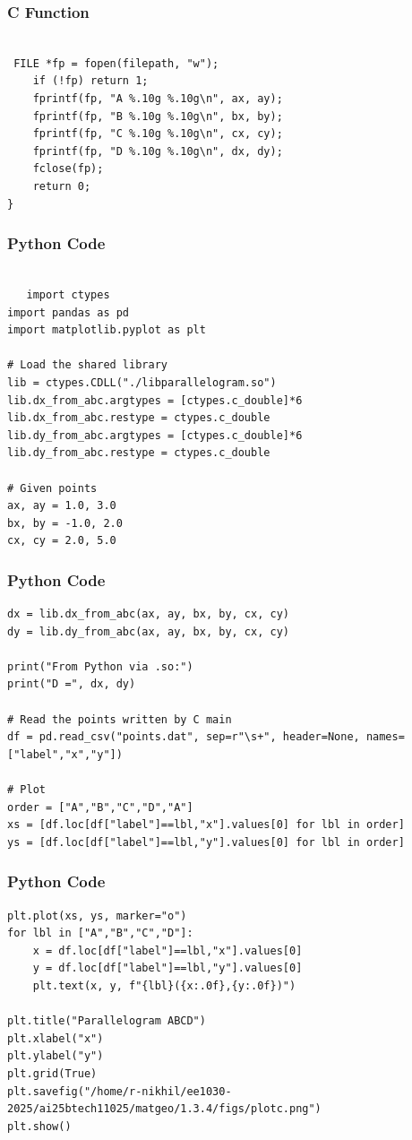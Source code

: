 \documentclass{beamer}
\begin{document}
\begin{frame}[fragile]
\frametitle{C Function}
   \begin{lstlisting}

 FILE *fp = fopen(filepath, "w");
    if (!fp) return 1;
    fprintf(fp, "A %.10g %.10g\n", ax, ay);
    fprintf(fp, "B %.10g %.10g\n", bx, by);
    fprintf(fp, "C %.10g %.10g\n", cx, cy);
    fprintf(fp, "D %.10g %.10g\n", dx, dy);
    fclose(fp);
    return 0;
}

   \end{lstlisting}
\end{frame}

\begin{frame}[fragile]
\frametitle{Python Code}
   \begin{lstlisting}

   import ctypes
import pandas as pd
import matplotlib.pyplot as plt

# Load the shared library
lib = ctypes.CDLL("./libparallelogram.so")
lib.dx_from_abc.argtypes = [ctypes.c_double]*6
lib.dx_from_abc.restype = ctypes.c_double
lib.dy_from_abc.argtypes = [ctypes.c_double]*6
lib.dy_from_abc.restype = ctypes.c_double

# Given points
ax, ay = 1.0, 3.0
bx, by = -1.0, 2.0
cx, cy = 2.0, 5.0

\end{lstlisting}
\end{frame}

\begin{frame}[fragile]
\frametitle{Python Code}
   \begin{lstlisting}
dx = lib.dx_from_abc(ax, ay, bx, by, cx, cy)
dy = lib.dy_from_abc(ax, ay, bx, by, cx, cy)

print("From Python via .so:")
print("D =", dx, dy)

# Read the points written by C main
df = pd.read_csv("points.dat", sep=r"\s+", header=None, names=["label","x","y"])

# Plot
order = ["A","B","C","D","A"]
xs = [df.loc[df["label"]==lbl,"x"].values[0] for lbl in order]
ys = [df.loc[df["label"]==lbl,"y"].values[0] for lbl in order]
   \end{lstlisting}
\end{frame}
\begin{frame}[fragile]
\frametitle{Python Code}
   \begin{lstlisting}
plt.plot(xs, ys, marker="o")
for lbl in ["A","B","C","D"]:
    x = df.loc[df["label"]==lbl,"x"].values[0]
    y = df.loc[df["label"]==lbl,"y"].values[0]
    plt.text(x, y, f"{lbl}({x:.0f},{y:.0f})")

plt.title("Parallelogram ABCD")
plt.xlabel("x")
plt.ylabel("y")
plt.grid(True)
plt.savefig("/home/r-nikhil/ee1030-2025/ai25btech11025/matgeo/1.3.4/figs/plotc.png")
plt.show()
\end{lstlisting}
\end{frame}
\end{document}

